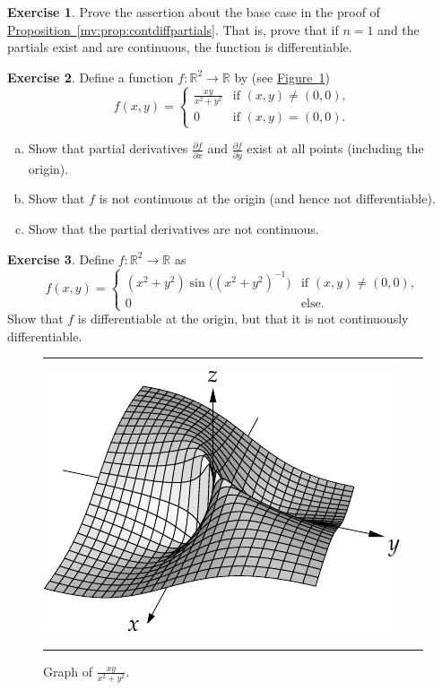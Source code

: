 \documentclass[12pt,openany]{book}
\newcommand{\R}{{\mathbb{R}}}
\theoremstyle{plain}
\theoremstyle{remark}
\theoremstyle{definition}
\newenvironment{exbox}{%
    \def\FrameCommand{\vrule width 1pt \relax\hspace{10pt}}%
    \MakeFramed{\advance\hsize-\width\FrameRestore}%
}{%
    \endMakeFramed
}
\newenvironment{exparts}{%
    \leavevmode\begin{enumerate}[a),noitemsep,topsep=0pt,parsep=0pt,partopsep=0pt]
}{%
    \end{enumerate}
}
\newenvironment{myfig}{%
\begin{figure}[h!t]
\noindent\rule{\textwidth}{0.4pt}\vspace{12pt}\par\centering}%
{\par\noindent\rule{\textwidth}{0.4pt}
\end{figure}}
\theoremstyle{exercise}
\newtheorem{exercise}{Exercise}[section]
\theoremstyle{example}
\newcommand{\figureref}[1]{\hyperref[#1]{Figure~\ref*{#1}}}
\newcommand{\propref}[1]{\hyperref[#1]{Proposition~\ref*{#1}}}
\begin{document}
\begin{exbox}
\begin{exercise}
Prove the assertion about the base case
in the proof of \propref{mv:prop:contdiffpartials}.  That is, prove that
if $n=1$ and 
the partials exist and are continuous, the function is 
differentiable.
\end{exercise}

\begin{exercise} \label{exercise:noncontpartialsexist}
Define a function $f \colon \R^2 \to \R$ by
(see \figureref{fig:xyxsqysqvol2})
\begin{equation*}
f(x,y)
=
\begin{cases}
\frac{xy}{x^2+y^2} & \text{if } (x,y) \not= (0,0), \\
0 & \text{if } (x,y) = (0,0).
\end{cases}
\end{equation*}
\begin{exparts}
\item
Show that partial derivatives 
$\frac{\partial f}{\partial x}$ and
$\frac{\partial f}{\partial y}$ exist at all points (including the origin).
\item
Show that $f$ is not continuous at the origin (and hence not
differentiable).
\item
Show that the partial derivatives are not continuous.
\end{exparts}
\end{exercise}

\begin{exercise}
Define $f \colon \R^2 \to \R$ as
\begin{equation*}
f(x,y) =
\begin{cases}
(x^2+y^2)\sin\bigl({(x^2+y^2)}^{-1}\bigr) & \text{if } (x,y) \not= (0,0), \\
0 & \text{else.}
\end{cases}
\end{equation*}
Show that $f$ is differentiable at the origin, but that it is not 
continuously differentiable.
\end{exercise}
\end{exbox}

\begin{myfig}
\includegraphics{figures/xyxsqysq}
\caption{Graph of $\frac{xy}{x^2+y^2}$.\label{fig:xyxsqysqvol2}}
\end{myfig}
\end{document}
